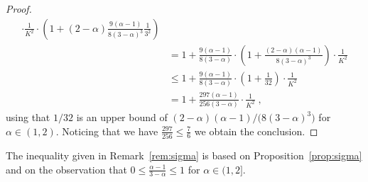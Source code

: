 \documentclass[11pt,oneside,a4paper]{article}
\newcommand{\lrb}[1]{\left(#1\right)}
\newcommand{\brb}[1]{\bigl(#1\bigr)}
\theoremstyle{plain}
\theoremstyle{definition}
\theoremstyle{remark}
\begin{document}
\begin{proof}
\begin{align*}
           \cdot \frac{1}{K^2}\cdot 
        \lrb{1 +  (2 - \alpha)\frac{9(\alpha - 1)}{8(3- \alpha)^3} \frac{1}{3^2}}
\\
&=
    1 +  \frac{9(\alpha - 1)}{8(3- \alpha)} 
        \cdot \lrb{1 +  \frac{(2-\alpha)(\alpha - 1)}{8(3- \alpha)^3}}
        \cdot \frac{1}{K^2}
\\
&\le
    1 +  \frac{9(\alpha - 1)}{8(3- \alpha)} 
        \cdot \lrb{1 +  \frac{1}{32}}
        \cdot \frac{1}{K^2}
\\
&=
    1 +  \frac{297(\alpha - 1)}{256(3- \alpha)} 
        \cdot \frac{1}{K^2}\;,
\end{align*}
using that $1/32$ is an upper bound of $(2-\alpha)(\alpha - 1)/\brb{8(3- \alpha)^3}$ for $\alpha \in (1, 2)$.
Noticing that we have $\frac{297}{256} \le \frac{7}{6}$ we obtain the conclusion.
\end{proof}
The inequality given in Remark~\ref{rem:sigma} is based on Proposition~\ref{prop:sigma} and on the observation that $0 \le \frac{\alpha - 1}{3-\alpha} \le 1$ for $\alpha \in (1,2]$.
\end{document}

